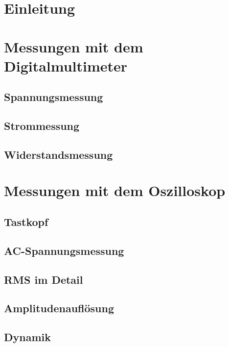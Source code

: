 \documentclass[a4paper]{article}
\begin{document}
\section{Einleitung}

\section{Messungen mit dem Digitalmultimeter}
\subsection{Spannungsmessung}
\subsection{Strommessung}
\subsection{Widerstandsmessung}
\section{Messungen mit dem Oszilloskop}
\subsection{Tastkopf}
\subsection{AC-Spannungsmessung}
\subsection{RMS im Detail}
\subsection{Amplitudenauflösung}
\subsection{Dynamik}
\end{document}
